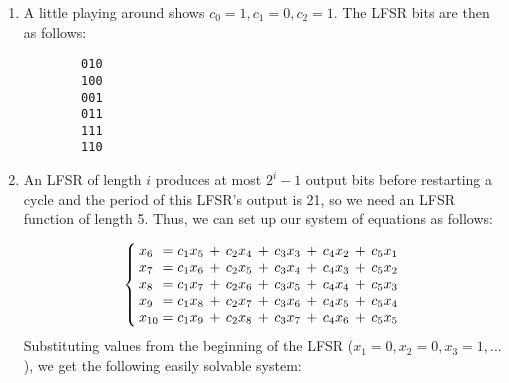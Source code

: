 \documentclass[12pt,letterpaper]{article}
\begin{document}
\pagestyle{fancy}
\rhead{\today}

\begin{enumerate}

    \item
    A little playing around shows $c_0 = 1, c_1 = 0, c_2 = 1$.  The LFSR bits are then as follows:
    \begin{verbatim}
        010
        100
        001
        011
        111
        110
    \end{verbatim}

    \item
    An LFSR of length $i$ produces at most $2^i-1$ output bits before restarting a cycle and the period of this LFSR's output is 21, so we need an LFSR function of length 5.
    Thus, we can set up our system of equations as follows:
    \begin{comment}
    \[
    \begin{cases}
        x_6 = c_1 x_5 + c_2 x_4 + c_3 x_3 + c_4 x_2 + c_5 x_1\\
        x_7 = c_1 x_5 + c_2 x_4 + c_3 x_3 + c_4 x_2 + c_5 x_1\\
        x_8 = c_1 x_5 + c_2 x_4 + c_3 x_3 + c_4 x_2 + c_5 x_1\\
        x_9 = c_1 x_5 + c_2 x_4 + c_3 x_3 + c_4 x_2 + c_5 x_1\\
        x_{10} = c_1 x_5 + c_2 x_4 + c_3 x_3 + c_4 x_2 + c_5 x_1\\
        x_{11} = c_1 x_5 + c_2 x_4 + c_3 x_3 + c_4 x_2 + c_5 x_1\\
    \end{cases}
    \]
    \end{comment}
    \[
    \left\{
        \setlength\arraycolsep{2pt}
        \begin{array}{ l @{{}={}} l c l c l c l c l }
        x_6    & c_1 x_5    &+& c_2 x_4 &+& c_3 x_3 &+& c_4 x_2 &+& c_5 x_1\\
        x_7    & c_1 x_6    &+& c_2 x_5 &+& c_3 x_4 &+& c_4 x_3 &+& c_5 x_2\\
        x_8    & c_1 x_7    &+& c_2 x_6 &+& c_3 x_5 &+& c_4 x_4 &+& c_5 x_3\\
        x_9    & c_1 x_8    &+& c_2 x_7 &+& c_3 x_6 &+& c_4 x_5 &+& c_5 x_4\\
        x_{10} & c_1 x_9    &+& c_2 x_8 &+& c_3 x_7 &+& c_4 x_6 &+& c_5 x_5\\
        \end{array}
        \right.
    \]
    Substituting values from the beginning of the LFSR ($x_1 = 0, x_2 = 0, x_3=1, ...$), we get the following easily solvable system:

\end{enumerate}
\end{document}
